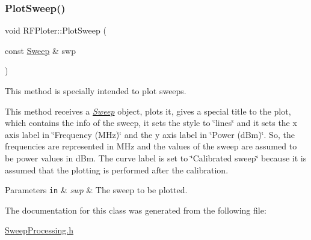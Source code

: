 \subsubsection{\texorpdfstring{Plot\+Sweep()}{PlotSweep()}}
{\footnotesize\ttfamily void R\+F\+Ploter\+::\+Plot\+Sweep (\begin{DoxyParamCaption}\item[{const \hyperlink{structSweep}{Sweep} \&}]{swp }\end{DoxyParamCaption})\hspace{0.3cm}{\ttfamily [inline]}}



This method is specially intended to plot sweeps. 

This method receives a {\itshape \hyperlink{structSweep}{Sweep}} object, plots it, gives a special title to the plot, which contains the info of the sweep, it sets the style to \char`\"{}lines\char`\"{} and it sets the x axis label in \char`\"{}\+Frequency (\+M\+Hz)\char`\"{} and the y axis label in \char`\"{}\+Power (d\+Bm)\char`\"{}. So, the frequencies are represented in M\+Hz and the values of the sweep are assumed to be power values in d\+Bm. The curve label is set to \char`\"{}\+Calibrated sweep\char`\"{} because it is assumed that the plotting is performed after the calibration. 
\begin{DoxyParams}[1]{Parameters}
\mbox{\tt in}  & {\em swp} & The sweep to be plotted. \\
\hline
\end{DoxyParams}


The documentation for this class was generated from the following file\+:\begin{DoxyCompactItemize}
\item 
\hyperlink{SweepProcessing_8h}{Sweep\+Processing.\+h}\end{DoxyCompactItemize}
